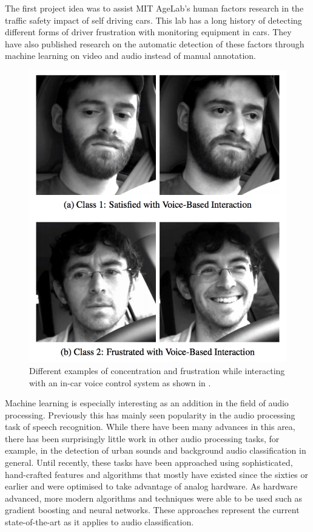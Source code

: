The first project idea was to assist MIT AgeLab's human factors research in the traffic safety impact of self driving cars. This lab has a long history of detecting different forms of driver frustration with monitoring equipment in cars. They have also published research on the automatic detection of these factors through machine learning on video and audio \cite{Abdic:2016:DFD:3060621.3060809} instead of manual annotation.


\begin{figure}[h]
    \centering
	\includegraphics[width=.65\textwidth]{./images/illustrations/driver-frustration}
    \caption{Different examples of concentration and frustration while interacting with an in-car voice control system as shown in \cite{Abdic:2016:DFD:3060621.3060809}.}
    \label{fig:am}
\end{figure}


Machine learning is especially interesting as an addition in the field of audio processing. Previously this has mainly seen popularity in the audio processing task of speech recognition. While there have been many advances in this area, there has been surprisingly little work in other audio processing tasks, for example, in the detection of urban sounds and background audio classification in general. Until recently, these tasks have been approached using sophisticated, hand-crafted features and algorithms that mostly have existed since the sixties or earlier and were optimised to take advantage of analog hardware. As hardware advanced, more modern algorithms and techniques were able to be used such as gradient boosting and neural networks. These approaches represent the current state-of-the-art as it applies to audio classification.



